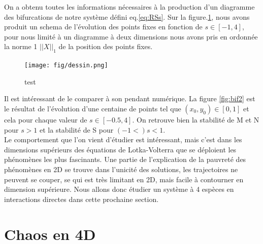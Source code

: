 \documentclass{wsdcr}
\begin{document}
On a obtenu toutes les informations nécessaires à la production d'un diagramme des bifurcations de notre système défini eq.\ref{eq:RSs}. Sur la figure.\ref{fig:dessinlv2}, nous avons produit un schema de l'évolution des points fixes en fonction de $s \in [-1,4]$, pour nous limité à un diagramme à deux dimensions nous avons pris en ordonnée la norme 1 $||X||_1$ de la position des points fixes.
\begin{figure}[t!]
    \centering
    \texttt{[image: fig/dessin.png]}
    \caption{test}
    \label{fig:dessinlv2}
\end{figure}
Il est intéressant de le comparer à son pendant numérique. La figure \ref{fig:bif2} est le résultat de l'évolution d'une centaine de points tel que $(x_0,y_0) \in [0,1]$ et cela pour chaque valeur de $s \in [-0.5,4]$. On retrouve bien la stabilité de M et N pour $s > 1$ et la stabilité de S pour $(-1<)s<1$. \\
Le comportement que l'on vient d'étudier est intéressant, mais c'est dans les dimensions supérieurs des équations de Lotka-Volterra que se déploient les phénomènes les plus fascinants. Une partie de l'explication de la pauvreté des phénomènes en 2D se trouve dans l'unicité des solutions, les trajectoires ne peuvent se couper, se qui est très limitant en 2D, mais facile à contourner en dimension supérieure. Nous allons donc étudier un système à 4 espèces en interactions directes dans cette prochaine section.
\section{Chaos en 4D}
\end{document}

